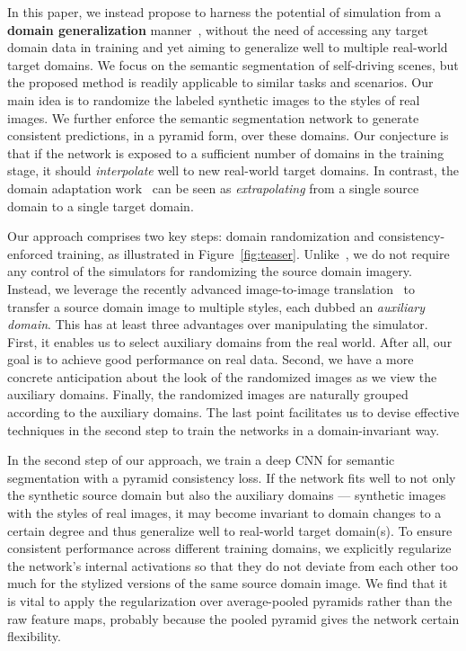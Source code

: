 \documentclass[10pt,twocolumn,letterpaper]{article}
\begin{document}
In this paper, we instead propose to harness the potential of simulation from a \textbf{domain generalization} manner~\cite{balaji2018metareg, li2018learning, ghifary2015domain, tobin2017domain}, without the need of accessing any target domain data in training and yet aiming to generalize well to multiple real-world target domains. We focus on the semantic segmentation of self-driving scenes, but the proposed method is readily applicable to similar tasks and scenarios. Our main idea is to randomize the labeled synthetic images to the styles of real images. We further enforce the semantic segmentation network to generate consistent predictions, in a pyramid form, over these domains. Our conjecture is that if the network is exposed to a sufficient number of domains in the training stage, it should  \emph{interpolate} well to new real-world target domains. In contrast, the domain adaptation work~\cite{fcn_in_the_wild, zhang2017curriculum,Hoffman_cycada2017} can be seen as \emph{extrapolating} from a single source domain to a single target domain. 

Our approach comprises two key steps: domain randomization and consistency-enforced training, as illustrated in Figure~\ref{fig:teaser}. Unlike~\cite{workshop_domain_randomization, sadeghi2016cad2rl}, we do not require any control of the simulators for randomizing the source domain imagery. Instead, we leverage the recently advanced image-to-image translation~\cite{CycleGAN2017} to transfer a source domain image to multiple styles, each dubbed an \textit{auxiliary domain}. This has at least three advantages over manipulating the simulator. First, it enables us to select auxiliary domains from the real world. After all, our goal is to achieve good performance on real data. Second, we have a more concrete anticipation about the look of the randomized images as we view the auxiliary domains. Finally, the randomized images are naturally grouped according to the auxiliary domains. The last point facilitates us to devise effective techniques in the second step to train the networks in a domain-invariant way. 

In the second step of our approach, we train a deep CNN for semantic segmentation with a pyramid consistency loss. If the network fits well to not only the synthetic source domain but also the auxiliary domains --- synthetic images with the styles of real images, it may become invariant to domain changes to a certain degree and thus generalize well to real-world target domain(s). To ensure consistent performance across different training domains, we explicitly regularize the network's internal activations so that they do not deviate from each other too much for the stylized versions of the same source domain image. We find that it is vital to apply the regularization over average-pooled pyramids rather than the raw feature maps, probably because the pooled pyramid gives the network certain flexibility.
\end{document}
